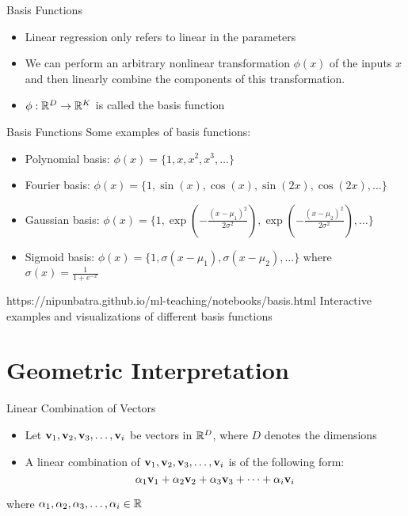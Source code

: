 \documentclass{beamer}
\begin{document}
\begin{frame}{Basis Functions}
    \begin{itemize}
        \item Linear regression only refers to linear in the parameters
        \item We can perform an arbitrary nonlinear transformation $\phi(x)$ of the inputs $x$ and then linearly combine the components of this transformation.
        \item $\phi: \mathbb{R}^D \rightarrow \mathbb{R}^K$ is called the basis function
    \end{itemize} 
    
\end{frame}

\begin{frame}{Basis Functions}
    Some examples of basis functions:
    \begin{itemize}
        \item Polynomial basis: $\phi(x) = \{1, x, x^2, x^3, \dots\}$
        \item Fourier basis: $\phi(x) = \{1, \sin(x), \cos(x), \sin(2x), \cos(2x), \dots\}$
        \item Gaussian basis: $\phi(x) = \{1, \exp(-\frac{(x-\mu_1)^2}{2\sigma^2}), \exp(-\frac{(x-\mu_2)^2}{2\sigma^2}), \dots\}$
        \item Sigmoid basis: $\phi(x) = \{1, \sigma(x-\mu_1), \sigma(x-\mu_2), \dots\}$ where $\sigma(x) = \frac{1}{1+e^{-x}}$
    \end{itemize}
    
    \begin{notebookbox}{https://nipunbatra.github.io/ml-teaching/notebooks/basis.html}
    Interactive examples and visualizations of different basis functions
    \end{notebookbox}
    
\end{frame}

\section{Geometric Interpretation}
\begin{frame}{Linear Combination of Vectors}
\begin{itemize}[<+->]
    \item Let $\mathbf{v}_{1},\mathbf{v}_{2},\mathbf{v}_{3},\dots,\mathbf{v}_{i}$ be vectors in  $\mathbb{R}^{D}$, where $D$ denotes the dimensions
    \item A linear combination of $\mathbf{v}_{1},\mathbf{v}_{2},\mathbf{v}_{3},\dots,\mathbf{v}_{i}$ is of the following form:
        \begin{equation*}
            \alpha_{1}\mathbf{v}_{1}+			\alpha_{2}\mathbf{v}_{2}+			\alpha_{3}\mathbf{v}_{3}+
            \dots+\alpha_{i}\mathbf{v}_{i}
        \end{equation*}
\end{itemize}
    
    where $\alpha_{1},\alpha_{2},\alpha_{3},\dots,\alpha_{i} \in \mathbb{R}$
    
\end{frame}
\end{document}
